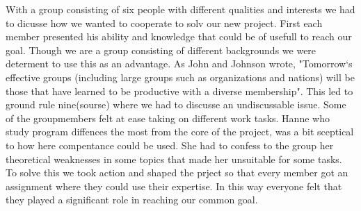 With a group consisting of six people with different qualities and interests we had to dicusse how we wanted to cooperate to solv our new project. First each member presented his ability and knowledge that could be of usefull to reach our goal. Though we are a group consisting of different backgrounds we were determent to use this as an advantage. As John and Johnson wrote, "Tomorrow`s effective groups (including large groups such as organizations and nations) will be those that have learned to be productive with a diverse membership". This led to ground rule nine(sourse) where we had to discusse an undiscussable issue. Some of the groupmembers felt at ease taking on different work tasks. Hanne who study program diffences the most from the core of the project, was a bit sceptical to how here compentance could be used. She had to confess to the group her theoretical weaknesses in some topics that made her unsuitable for some tasks. To solve this we took action and shaped the prject so that every member got an assignment where they could use their expertise. In this way everyone felt that they played a significant role in reaching our common goal. 




 

  